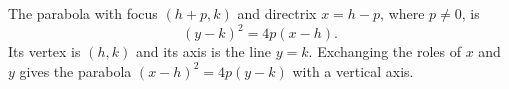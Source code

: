 \begin{theorem}\label{thm:parabola-standard}
  The parabola with focus $(h + p, k)$ and directrix $x = h - p$, where
  $p \neq 0$, is
  \[
    (y - k)^2 = 4p(x - h).
  \]
  Its vertex is $(h, k)$ and its axis is the line $y = k$. Exchanging the roles
  of $x$ and $y$ gives the parabola $(x - h)^2 = 4p(y - k)$ with a vertical axis.
\end{theorem}

